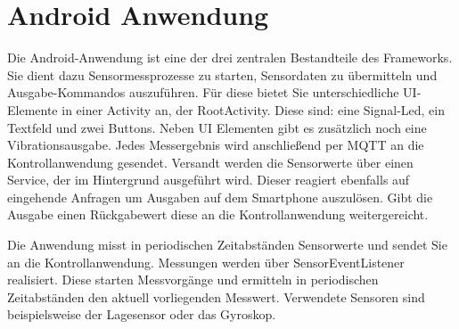 \documentclass[11pt,a4paper]{report}
\begin{document}
\chapter{Android Anwendung}\label{chap:app}
Die Android-Anwendung ist eine der drei zentralen Bestandteile des Frameworks.
Sie dient dazu Sensormessprozesse zu starten, Sensordaten zu übermitteln und Ausgabe-Kommandos auszuführen.
Für diese bietet Sie unterschiedliche UI-Elemente in einer Activity an, der RootActivity.
Diese sind: eine Signal-Led, ein Textfeld und zwei Buttons.
Neben UI Elementen gibt es zusätzlich noch eine Vibrationsausgabe. 
Jedes Messergebnis wird anschließend per MQTT an die Kontrollanwendung gesendet.
Versandt werden die Sensorwerte über einen Service, der im Hintergrund ausgeführt wird.
Dieser reagiert ebenfalls auf eingehende Anfragen um Ausgaben auf dem Smartphone auszulösen.
Gibt die Ausgabe einen Rückgabewert diese an die Kontrollanwendung weitergereicht.

Die Anwendung misst in periodischen Zeitabständen Sensorwerte und sendet Sie an die Kontrollanwendung.
Messungen werden über SensorEventListener realisiert.
Diese starten Messvorgänge und ermitteln in periodischen Zeitabständen den aktuell vorliegenden Messwert.
Verwendete Sensoren sind beispielsweise der Lagesensor oder das Gyroskop.
\end{document}
